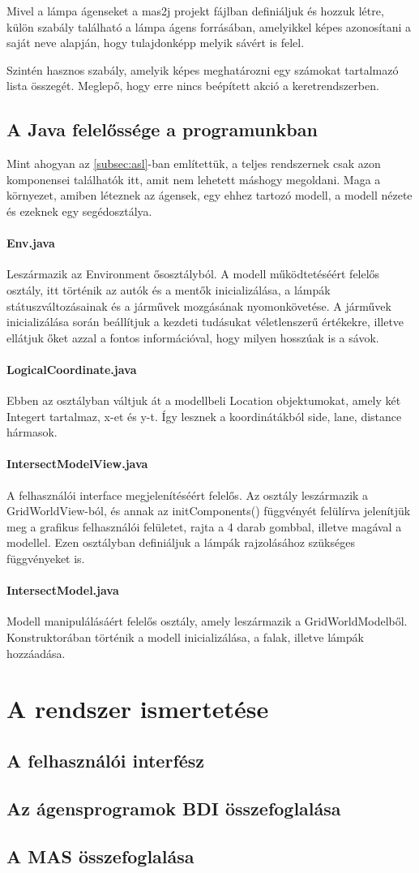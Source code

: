 \documentclass[a4paper, 11pt]{article}
\begin{document}
Mivel a lámpa ágenseket a mas2j projekt fájlban definiáljuk és hozzuk létre, külön szabály található a
lámpa ágens forrásában, amelyikkel képes azonosítani a saját neve alapján, hogy tulajdonképp melyik sávért
is felel.

Szintén hasznos szabály, amelyik képes meghatározni egy számokat tartalmazó lista összegét. Meglepő, hogy
erre nincs beépített akció a keretrendszerben.

\subsection{A Java felelőssége a programunkban}
Mint ahogyan az \autoref{subsec:asl}-ban említettük, a teljes rendszernek csak azon komponensei találhatók
itt, amit nem lehetett máshogy megoldani. Maga a környezet, amiben léteznek az ágensek, egy ehhez tartozó
modell, a modell nézete és ezeknek egy segédosztálya.

\paragraph{Env.java}
Leszármazik az Environment ősosztályból.
A modell működtetéséért felelős osztály, itt történik az autók és a mentők inicializálása,
a lámpák státuszváltozásainak és a járművek mozgásának nyomonkövetése.
A járművek inicializálása során beállítjuk a kezdeti tudásukat véletlenszerű értékekre, illetve
ellátjuk őket azzal a fontos információval, hogy milyen hosszúak is a sávok.

\paragraph{LogicalCoordinate.java}
Ebben az osztályban váltjuk át a modellbeli Location objektumokat, amely két Integert tartalmaz, x-et és y-t. Így lesznek a koordinátákból side, lane, distance hármasok.
\paragraph{IntersectModelView.java}
A felhasználói interface megjelenítéséért felelős. Az osztály leszármazik a GridWorldView-ból, és annak az initComponents() függvényét felülírva jelenítjük meg a grafikus felhasználói felületet, rajta a 4 darab gombbal, illetve magával a modellel. Ezen osztályban definiáljuk a lámpák rajzolásához szükséges függvényeket is.
\paragraph{IntersectModel.java}
Modell manipulálásáért felelős osztály, amely leszármazik a GridWorldModelből. Konstruktorában történik a modell inicializálása, a falak, illetve lámpák hozzáadása.

\section{A rendszer ismertetése}
\subsection{A felhasználói interfész}
\subsection{Az ágensprogramok BDI összefoglalása}
\subsection{A MAS összefoglalása}
\end{document}
